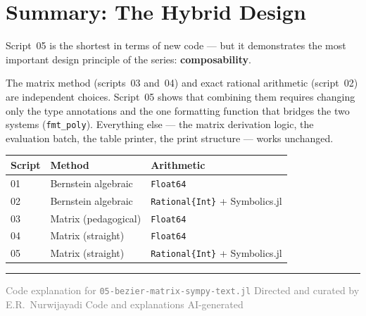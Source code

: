 \documentclass[12pt, a4paper]{article}
\newcommand{\cd}[1]{\texttt{#1}}
\begin{document}
\section{Summary: The Hybrid Design}

Script~05 is the shortest in terms of new code ---
but it demonstrates the most important design principle
of the series: \textbf{composability}.

The matrix method (scripts~03 and~04) and exact rational
arithmetic (script~02) are independent choices.
Script~05 shows that combining them requires changing
only the type annotations and the one formatting function
that bridges the two systems (\cd{fmt\_poly}).
Everything else --- the matrix derivation logic, the
evaluation batch, the table printer, the print structure
--- works unchanged.

\begin{center}
\begin{tabular}{lll}
\toprule
Script & Method & Arithmetic \\
\midrule
01 & Bernstein algebraic & \cd{Float64} \\
02 & Bernstein algebraic & \cd{Rational\{Int\}} + Symbolics.jl \\
03 & Matrix (pedagogical) & \cd{Float64} \\
04 & Matrix (straight) & \cd{Float64} \\
05 & Matrix (straight) & \cd{Rational\{Int\}} + Symbolics.jl \\
\bottomrule
\end{tabular}
\end{center}

\vspace{2em}\hrule\vspace{0.5em}
{\small\textcolor{gray}{%
Code explanation for \texttt{05-bezier-matrix-sympy-text.jl}
\textbar{} Directed and curated by E.R.\ Nurwijayadi
\textbar{} Code and explanations AI-generated}}
\end{document}
